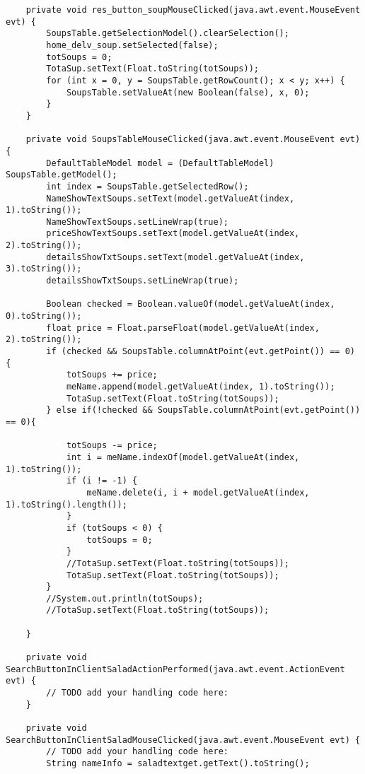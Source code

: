 \documentclass[12pt,a4paper]{article}
\begin{document}
\begin{lstlisting}
    private void res_button_soupMouseClicked(java.awt.event.MouseEvent evt) {                                             
        SoupsTable.getSelectionModel().clearSelection();
        home_delv_soup.setSelected(false);
        totSoups = 0;
        TotaSup.setText(Float.toString(totSoups));
        for (int x = 0, y = SoupsTable.getRowCount(); x < y; x++) {
            SoupsTable.setValueAt(new Boolean(false), x, 0);
        }
    }                                            

    private void SoupsTableMouseClicked(java.awt.event.MouseEvent evt) {                                        
        DefaultTableModel model = (DefaultTableModel) SoupsTable.getModel();
        int index = SoupsTable.getSelectedRow();
        NameShowTextSoups.setText(model.getValueAt(index, 1).toString());
        NameShowTextSoups.setLineWrap(true);
        priceShowTextSoups.setText(model.getValueAt(index, 2).toString());
        detailsShowTxtSoups.setText(model.getValueAt(index, 3).toString());
        detailsShowTxtSoups.setLineWrap(true);

        Boolean checked = Boolean.valueOf(model.getValueAt(index, 0).toString());
        float price = Float.parseFloat(model.getValueAt(index, 2).toString());
        if (checked && SoupsTable.columnAtPoint(evt.getPoint()) == 0) {
            totSoups += price;
            meName.append(model.getValueAt(index, 1).toString());
            TotaSup.setText(Float.toString(totSoups));
        } else if(!checked && SoupsTable.columnAtPoint(evt.getPoint()) == 0){
            
            totSoups -= price;
            int i = meName.indexOf(model.getValueAt(index, 1).toString());
            if (i != -1) {
                meName.delete(i, i + model.getValueAt(index, 1).toString().length());
            }
            if (totSoups < 0) {
                totSoups = 0;
            }
            //TotaSup.setText(Float.toString(totSoups));
            TotaSup.setText(Float.toString(totSoups));
        }
        //System.out.println(totSoups);
        //TotaSup.setText(Float.toString(totSoups));

    }                                       

    private void SearchButtonInClientSaladActionPerformed(java.awt.event.ActionEvent evt) {                                                          
        // TODO add your handling code here:
    }                                                         

    private void SearchButtonInClientSaladMouseClicked(java.awt.event.MouseEvent evt) {                                                       
        // TODO add your handling code here:
        String nameInfo = saladtextget.getText().toString();


\end{lstlisting}
\end{document}
